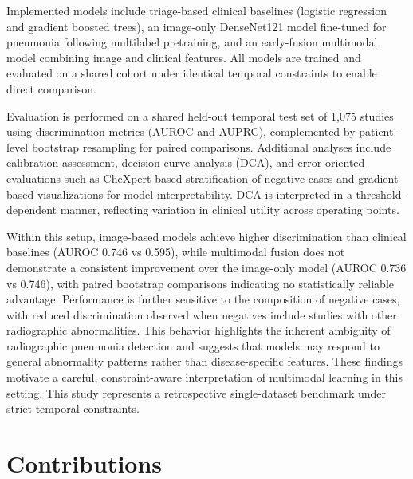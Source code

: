Implemented models include triage-based clinical baselines (logistic regression and gradient boosted trees), an image-only DenseNet121 model fine-tuned for pneumonia following multilabel pretraining, and an early-fusion multimodal model combining image and clinical features. All models are trained and evaluated on a shared cohort under identical temporal constraints to enable direct comparison.

Evaluation is performed on a shared held-out temporal test set of 1{,}075 studies using discrimination metrics (AUROC and AUPRC), complemented by patient-level bootstrap resampling for paired comparisons. Additional analyses include calibration assessment, decision curve analysis (DCA), and error-oriented evaluations such as CheXpert-based stratification of negative cases and gradient-based visualizations for model interpretability. DCA is interpreted in a threshold-dependent manner, reflecting variation in clinical utility across operating points.

Within this setup, image-based models achieve higher discrimination than clinical baselines (AUROC 0.746 vs 0.595), while multimodal fusion does not demonstrate a consistent improvement over the image-only model (AUROC 0.736 vs 0.746), with paired bootstrap comparisons indicating no statistically reliable advantage. Performance is further sensitive to the composition of negative cases, with reduced discrimination observed when negatives include studies with other radiographic abnormalities. This behavior highlights the inherent ambiguity of radiographic pneumonia detection and suggests that models may respond to general abnormality patterns rather than disease-specific features. These findings motivate a careful, constraint-aware interpretation of multimodal learning in this setting. This study represents a retrospective single-dataset benchmark under strict temporal constraints.

\section*{Contributions}

